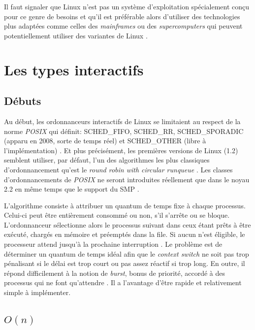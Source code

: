 \documentclass[letterpaper]{article}
\begin{document}
Il faut signaler que Linux n'est pas un système d'exploitation spécialement conçu pour ce genre de besoins et qu'il est préférable alors d'utiliser des technologies plus adaptées comme celles des \textit{mainframes} ou des \textit{supercomputers} qui peuvent potentiellement utiliser des variantes de Linux \citep{Encyclopedia:2011}.

\section{Les types interactifs}

\subsection{Débuts}

Au début, les ordonnanceurs interactifs de Linux se limitaient au respect de la norme \textit{POSIX} qui définit: SCHED\_FIFO, SCHED\_RR, SCHED\_SPORADIC (apparu en 2008, sorte de temps réel) et SCHED\_OTHER (libre à l'implémentation) \citep{6506091}. Et plus précisément, les premières versions de Linux (1.2) semblent utiliser, par défaut, l'un des algorithmes les plus classiques d'ordonnancement qu'est le \textit{round robin with circular runqueue} \citep{Maxwell:1999:LCK:519502, Beck:1996:LKI:547935}. Les classes d'ordonnancements de \textit{POSIX} ne seront introduites réellement que dans le noyau 2.2 en même temps que le support du SMP \citep{ScalableLinuxScheduling}.

L'algorithme consiste à attribuer un quantum de temps fixe à chaque processus. Celui-ci peut être entièrement consommé ou non, s'il s'arrête ou se bloque. L'ordonnanceur sélectionne alors le processus suivant dans ceux étant prêts à être exécuté, chargés en mémoire et préemptés dans la file. Si aucun n'est éligible, le processeur attend jusqu'à la prochaine interruption \citep{corbato1962experimental}. Le problème est de déterminer un quantum de temps idéal afin que le \textit{context switch} ne soit pas trop pénalisant si le délai est trop court ou pas assez réactif si trop long. En outre, il répond difficilement à la notion de \textit{burst}, bonus de priorité, accordé à des processus qui ne font qu'attendre \citep{Bach:1986:DUO:8570}. Il a l'avantage d'être rapide et relativement simple à implémenter.

\subsection{$O(n)$}
\end{document}

